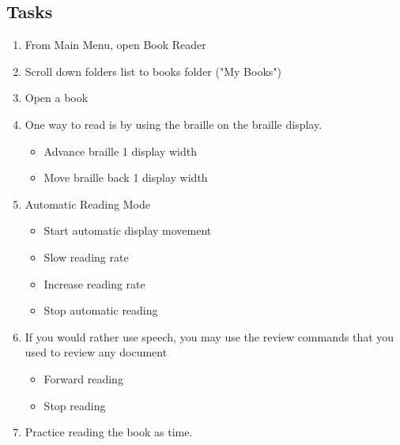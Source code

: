 \documentclass[10pt,letterpaper,twoside]{report}
\begin{document}
\subsection{Tasks}
\begin{enumerate}
	\item From Main Menu, open Book Reader 
	\item Scroll down folders list to books folder ("My Books") 
	\item Open a book 
	\item One way to read is by using the braille on the braille display.
	      \begin{itemize}
		      \item Advance braille 1 display width 
		      \item Move braille back 1 display width 
	      \end{itemize}
	\item Automatic Reading Mode
	      \begin{itemize}
		      \item Start automatic display movement 
		      \item Slow reading rate 
		      \item Increase reading rate 
		      \item Stop automatic reading 
	      \end{itemize}
	\item If you would rather use speech, you may use the review commands that you used to review any document
	      \begin{itemize}
		      \item Forward reading 
		      \item Stop reading 
	      \end{itemize}
	\item Practice reading the book as time.
\end{enumerate}
\end{document}
